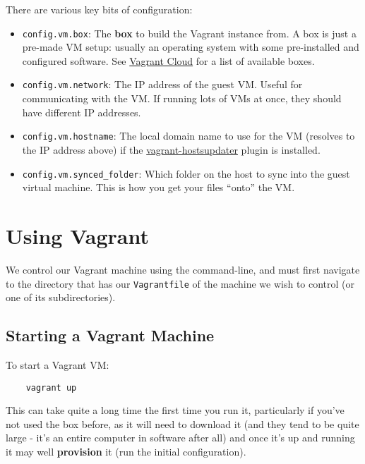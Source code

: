 There are various key bits of configuration:

\begin{itemize}

    \item \texttt{config.vm.box}: The \textbf{box} to build the Vagrant instance from. A box is just a pre-made VM setup: usually an operating system with some pre-installed and configured software. See \href{https://app.vagrantup.com/boxes/search}{Vagrant Cloud} for a list of available boxes.

    \item \texttt{config.vm.network}: The IP address of the guest VM. Useful for communicating with the VM. If running lots of VMs at once, they should have different IP addresses.

    \item \texttt{config.vm.hostname}: The local domain name to use for the VM (resolves to the IP address above) if the \href{https://github.com/cogitatio/vagrant-hostsupdater}{vagrant-hostsupdater} plugin is installed.

    \item \texttt{config.vm.synced\_folder}: Which folder on the host to sync into the guest virtual machine. This is how you get your files ``onto'' the VM.

\end{itemize}


\section{Using Vagrant}

We control our Vagrant machine using the command-line, and must first navigate to the directory that has our \texttt{Vagrantfile} of the machine we wish to control (or one of its subdirectories).

\subsection{Starting a Vagrant Machine}

To start a Vagrant VM:

\begin{verbatim}
    vagrant up
\end{verbatim}

This can take quite a long time the first time you run it, particularly if you've not used the box before, as it will need to download it (and they tend to be quite large - it's an entire computer in software after all) and once it's up and running it may well \textbf{provision} it (run the initial configuration).
\\

